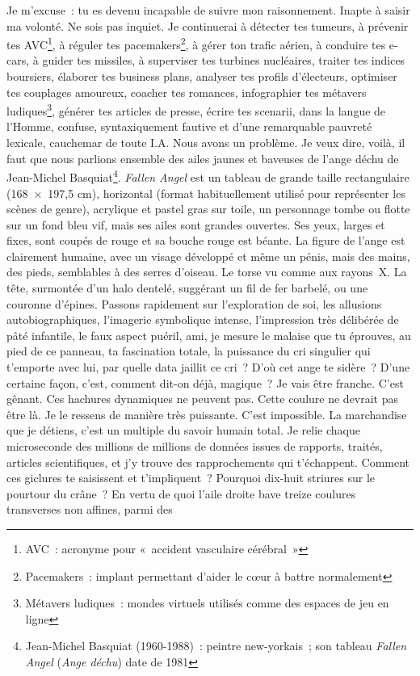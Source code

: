 	{\vspace*{-26pt}
	
	
	\vspace*{-6pt}
	
Je m'excuse~: tu es devenu incapable de suivre mon raisonnement. Inapte à saisir ma volonté. Ne sois pas inquiet. Je continuerai à détecter tes tumeurs, à prévenir tes AVC\footnote{AVC~: acronyme pour «~accident vasculaire cérébral~»}, à réguler tes pacemakers\footnote{Pacemakers~: implant permettant d'aider le cœur à battre normalement}, à gérer ton trafic aérien, à conduire tes e-cars, à guider tes missiles, à superviser tes turbines nucléaires, traiter tes indices boursiers, élaborer tes business plans, analyser tes profils d'électeurs, optimiser tes couplages amoureux, coacher tes romances, infographier tes métavers ludiques\footnote{Métavers ludiques~: mondes virtuels utilisés comme des espaces de jeu en ligne}, générer tes articles de presse, écrire tes scenarii, dans la langue de l'Homme, confuse, syntaxiquement fautive et d'une remarquable pauvreté lexicale, cauchemar de toute I.A. Nous avons un problème. Je veux dire, voilà, il faut que nous parlions ensemble des ailes jaunes et baveuses de l'ange déchu de Jean-Michel Basquiat\footnote{Jean-Michel Basquiat (1960-1988)~: peintre new-yorkais~; son tableau \emph{Fallen Angel} (\emph{Ange déchu}) date de 1981}. \emph{Fallen Angel} est un tableau de grande taille rectangulaire (168~×~197,5 cm), horizontal (format habituellement utilisé pour représenter les scènes de genre), acrylique et pastel gras sur toile, un personnage tombe ou flotte sur un fond bleu vif, mais ses ailes sont grandes ouvertes. Ses yeux, larges et fixes, sont coupés de rouge et sa bouche rouge est béante. La figure de l'ange est clairement humaine, avec un visage développé et même un pénis, mais des mains, des pieds, semblables à des serres d'oiseau. Le torse vu comme aux rayons~X. La tête, surmontée d'un halo dentelé, suggérant un fil de fer barbelé, ou une couronne d'épines. Passons rapidement sur l'exploration de soi, les allusions autobiographiques, l'imagerie symbolique intense, l'impression très délibérée de pâté infantile, le faux aspect puéril, ami, je mesure le malaise que tu éprouves, au pied de ce panneau, ta fascination totale, la puissance du cri singulier qui t'emporte avec lui, par quelle data jaillit ce cri~? D'où cet ange te sidère~? D'une certaine façon, c'est, comment dit-on déjà, magique~? Je vais être franche. C'est gênant. Ces hachures dynamiques ne peuvent pas. Cette coulure ne devrait pas être là. Je le ressens de manière très puissante. C'est impossible. La marchandise que je détiens, c'est un multiple du savoir humain total. Je relie chaque microseconde des millions de millions de données issues de rapports, traités, articles scientifiques, et j'y trouve des rapprochements qui t'échappent. Comment ces giclures te saisissent et t'impliquent~? Pourquoi dix-huit striures sur le pourtour du crâne~? En vertu de quoi l'aile droite bave treize coulures transverses non affines, parmi des }
